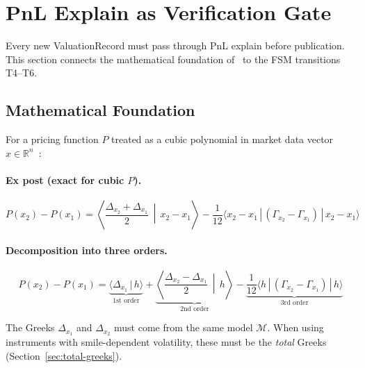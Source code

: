 \documentclass[11pt,a4paper]{article}
\begin{document}
\clearpage
\section{PnL Explain as Verification Gate}
\label{sec:pnl-explain}

Every new ValuationRecord must pass through PnL explain before publication.  This section connects the mathematical foundation of~\cite{pnl_explain,pnl_total_gamma} to the FSM transitions T4--T6.

\subsection{Mathematical Foundation}

For a pricing function $P$ treated as a cubic polynomial in market data vector $x \in \mathbb{R}^n$~\cite{pnl_explain,pnl_total_gamma}:

\paragraph{Ex post (exact for cubic $P$).}
\begin{equation}
\label{eq:pnl-expost}
P(x_2) - P(x_1) = \left\langle \frac{\Delta_{x_2} + \Delta_{x_1}}{2} \,\middle|\, x_2 - x_1 \right\rangle - \frac{1}{12}\langle x_2 - x_1 \,|\, (\Gamma_{x_2} - \Gamma_{x_1}) \,|\, x_2 - x_1 \rangle
\end{equation}

\paragraph{Decomposition into three orders.}
\begin{equation}
\label{eq:pnl-decomp}
P(x_2) - P(x_1) = \underbrace{\langle \Delta_{x_1} \,|\, h \rangle}_{\text{1st order}} + \underbrace{\left\langle \frac{\Delta_{x_2} - \Delta_{x_1}}{2} \,\middle|\, h \right\rangle}_{\text{2nd order}} - \underbrace{\frac{1}{12}\langle h \,|\, (\Gamma_{x_2} - \Gamma_{x_1}) \,|\, h \rangle}_{\text{3rd order}}
\end{equation}

\noindent The Greeks $\Delta_{x_1}$ and $\Delta_{x_2}$ must come from the same model $\mathcal{M}$.  When using instruments with smile-dependent volatility, these must be the \emph{total} Greeks (Section~\ref{sec:total-greeks}).
\end{document}
